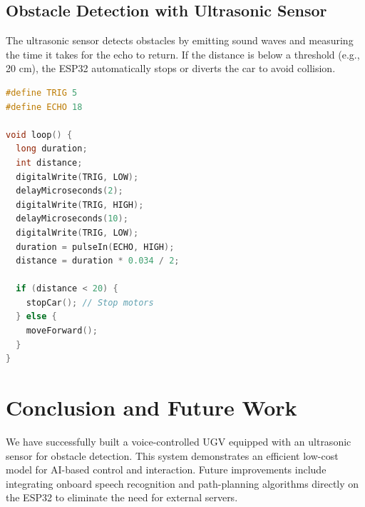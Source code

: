 \documentclass[a4paper,12pt]{article}
\begin{document}
\subsection{Obstacle Detection with Ultrasonic Sensor}
The ultrasonic sensor detects obstacles by emitting sound waves and measuring the time it takes for the echo to return.  
If the distance is below a threshold (e.g., 20 cm), the ESP32 automatically stops or diverts the car to avoid collision.

\begin{lstlisting}[language=C++, caption=Sample Ultrasonic Code Snippet]
#define TRIG 5
#define ECHO 18

void loop() {
  long duration;
  int distance;
  digitalWrite(TRIG, LOW);
  delayMicroseconds(2);
  digitalWrite(TRIG, HIGH);
  delayMicroseconds(10);
  digitalWrite(TRIG, LOW);
  duration = pulseIn(ECHO, HIGH);
  distance = duration * 0.034 / 2;

  if (distance < 20) {
    stopCar(); // Stop motors
  } else {
    moveForward();
  }
}
\end{lstlisting}

\section{Conclusion and Future Work}
We have successfully built a voice-controlled UGV equipped with an ultrasonic sensor for obstacle detection. This system demonstrates an efficient low-cost model for AI-based control and interaction. Future improvements include integrating onboard speech recognition and path-planning algorithms directly on the ESP32 to eliminate the need for external servers.



\end{document}
